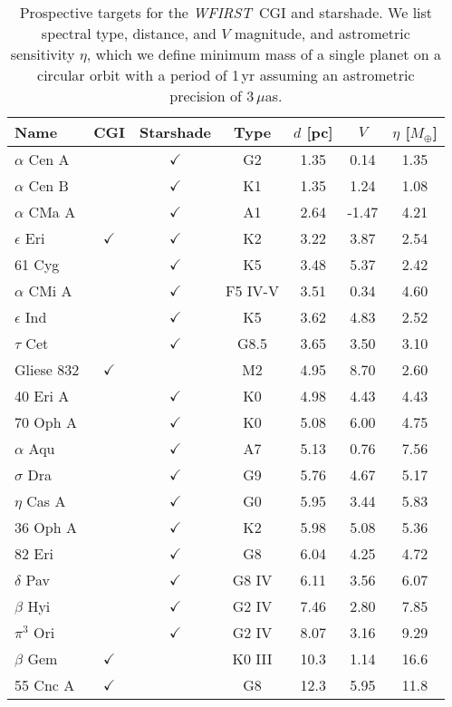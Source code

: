 \documentclass[modern, times]{aastex61}
\newcommand\wfirst{\textit{WFIRST}}
\begin{document}
\begin{table}[t]
\caption{Prospective targets for the \wfirst\ CGI and starshade. We list spectral type, distance, and $V$ magnitude, and astrometric sensitivity $\eta$, which we define minimum mass of a single planet on a circular orbit with a period of 1\,yr assuming an astrometric precision of 3\,$\mu$as.}
\label{tab:synergies}
\setlength{\tabcolsep}{.25em}
\begin{tabular}{lcccccc}
\hline\hline
Name & CGI & Starshade & Type & $d$ [pc] & $V$ & $\eta$ [$M_\oplus$]\\
\hline
$\alpha$ Cen A & & $\checkmark$ & G2 & 1.35 & 0.14 & 1.35\\
$\alpha$ Cen B & & $\checkmark$ & K1 & 1.35 & 1.24 & 1.08\\
$\alpha$ CMa A & & $\checkmark$ & A1 & 2.64 & -1.47 & 4.21\\
$\epsilon$ Eri & $\checkmark$ & $\checkmark$ & K2 & 3.22 & 3.87 & 2.54\\
61 Cyg & & $\checkmark$ & K5 & 3.48 & 5.37 & 2.42\\
$\alpha$ CMi A & & $\checkmark$ & F5 IV-V & 3.51 & 0.34 & 4.60\\
$\epsilon$ Ind & & $\checkmark$ & K5 & 3.62 & 4.83 & 2.52\\
$\tau$ Cet & & $\checkmark$ & G8.5 & 3.65 & 3.50 & 3.10\\
Gliese 832  & $\checkmark$ & & M2 & 4.95 & 8.70 & 2.60\\
40 Eri A & & $\checkmark$ & K0 & 4.98 & 4.43 & 4.43\\
70 Oph A & & $\checkmark$ & K0 & 5.08 & 6.00 & 4.75\\
$\alpha$ Aqu & & $\checkmark$ & A7 & 5.13 & 0.76 & 7.56\\
$\sigma$ Dra & & $\checkmark$ & G9 & 5.76 & 4.67 & 5.17\\
$\eta$ Cas A & & $\checkmark$ & G0 & 5.95 & 3.44 & 5.83\\
36 Oph A & & $\checkmark$ & K2 & 5.98 & 5.08 & 5.36\\
82 Eri & & $\checkmark$ & G8 & 6.04 & 4.25 & 4.72\\
$\delta$ Pav & & $\checkmark$ & G8 IV & 6.11 & 3.56 & 6.07\\
$\beta$ Hyi & & $\checkmark$ & G2 IV & 7.46 & 2.80 & 7.85\\
$\pi^3$ Ori & & $\checkmark$ & G2 IV & 8.07 & 3.16 & 9.29\\
$\beta$ Gem & $\checkmark$ & & K0 III & 10.3 & 1.14 & 16.6 \\
55 Cnc A & $\checkmark$ & & G8 & 12.3 & 5.95 & 11.8\\

\end{tabular}
\end{table}
\end{document}
